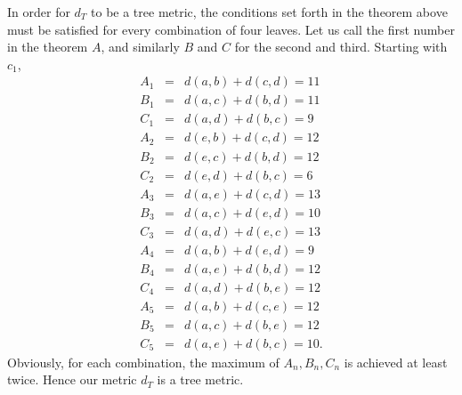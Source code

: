 \documentclass[a4paper]{article}
\begin{document}
In order for $d_T$ to be a tree metric, the conditions set forth in the theorem above must be satisfied for every combination of four leaves. Let us call the first number in the theorem $A$, and similarly $B$ and $C$ for the second and third. Starting with $c_1$,
\begin{eqnarray*}
A_1 & = & d(a,b) + d(c,d) = 11\\
B_1 & = & d(a,c) + d(b,d) = 11\\
C_1 & = & d(a,d) + d(b,c) = 9\\
A_2 & = & d(e,b) + d(c,d) = 12\\
B_2 & = & d(e,c) + d(b,d) = 12\\
C_2 & = & d(e,d) + d(b,c)  = 6\\ 
A_3 & = & d(a,e) + d(c,d) = 13\\
B_3 & = & d(a,c) + d(e,d) = 10\\ 
C_3 & = & d(a,d) + d(e,c)  = 13\\
A_4 & = & d(a,b) + d(e,d)  = 9\\
B_4 & = & d(a,e) + d(b,d) = 12\\
C_4 & = & d(a,d) + d(b,e) = 12\\ 
A_5 & = & d(a,b) + d(c,e) = 12\\
B_5 & = & d(a,c) + d(b,e) = 12\\ 
C_5 & = & d(a,e) + d(b,c) = 10.
\end{eqnarray*}
Obviously, for each combination, the maximum of $A_n, B_n, C_n$ is achieved at least twice. Hence our metric $d_T$ is a tree metric.  \\
\end{document}
